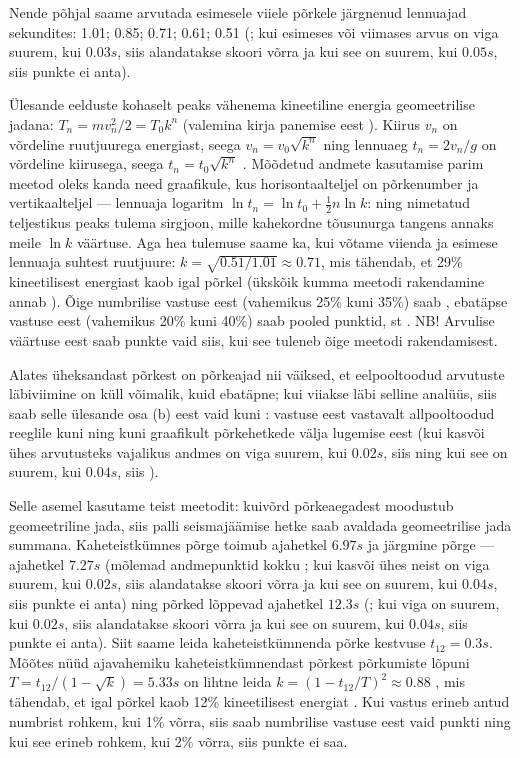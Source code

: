 Nende põhjal saame arvutada esimesele viiele põrkele järgnenud lennuajad sekundites: \num{1,01}; \num{0,85}; \num{0,71}; \num{0,61}; \num{0,51} (; kui esimeses või viimases arvus on viga suurem, kui $\SI {0.03}s$, siis alandatakse skoori  võrra ja kui see on suurem, kui $\SI{0.05}s$, siis punkte ei anta).

Ülesande eelduste kohaselt peaks vähenema kineetiline energia geomeetrilise jadana: $T_n=mv_n^2/2=T_0k^n$ (valemina kirja panemise eest ). Kiirus $v_n$ on võrdeline ruutjuurega energiast, seega $v_n=v_0\sqrt{k^n}$  ning lennuaeg $t_n=2v_n/g$ on võrdeline kiirusega, seega $t_n=t_0\sqrt{k^n}$ . Mõõdetud andmete kasutamise parim meetod oleks kanda need graafikule, kus horisontaalteljel on põrkenumber ja vertikaalteljel --- lennuaja logaritm $\ln t_n=\ln t_0 + \frac 12n\ln k$:  ning nimetatud teljestikus peaks tulema sirgjoon, mille kahekordne tõusunurga tangens annaks meile $\ln k$ väärtuse. Aga hea tulemuse saame ka, kui võtame viienda ja esimese lennuaja suhtest ruutjuure:  $k=\sqrt{0.51/1.01}\approx 0.71$, mis tähendab, et 29\% kineetilisest energiast kaob igal põrkel (ükskõik kumma meetodi rakendamine annab ). Õige numbrilise vastuse eest (vahemikus 25\% kuni 35\%) saab , ebatäpse vastuse eest (vahemikus 20\% kuni 40\%) saab pooled punktid, st . NB! Arvulise väärtuse eest saab punkte vaid siis, kui see tuleneb õige meetodi rakendamisest.

\osa Alates üheksandast põrkest on põrkeajad nii väiksed, et eelpooltoodud arvutuste läbiviimine on küll võimalik, kuid ebatäpne; kui viiakse läbi selline analüüs, siis saab selle ülesande osa (b) eest vaid kuni : vastuse eest vastavalt allpooltoodud reeglile kuni  ning kuni  graafikult põrkehetkede välja lugemise eest (kui kasvõi ühes arvutusteks vajalikus andmes on viga suurem, kui $\SI{0.02}s$, siis  ning kui see on suurem, kui $\SI{0.04}s$, siis ).

Selle asemel kasutame teist meetodit: kuivõrd põrkeaegadest moodustub geomeetriline jada, siis palli seismajäämise hetke saab avaldada geomeetrilise jada summana. Kaheteistkümnes põrge toimub ajahetkel $\SI{6.97}s$ ja järgmine põrge --- ajahetkel $\SI{7.27}s$ (mõlemad andmepunktid kokku ; kui kasvõi ühes neist on viga suurem, kui $\SI {0.02}s$, siis alandatakse skoori  võrra ja kui see on suurem, kui $\SI {0.04}s$, siis punkte ei anta) ning põrked lõppevad ajahetkel $\SI{12.3}s$ (; kui viga on suurem, kui $\SI {0.02}s$, siis alandatakse skoori  võrra ja kui see on suurem, kui $\SI {0.04}s$, siis punkte ei anta). Siit saame leida kaheteistkümnenda põrke kestvuse $t_{12}=\SI{0.3}s$.
Mõõtes nüüd ajavahemiku kaheteistkümnendast põrkest põrkumiste lõpuni $T=t_{12}/(1-\sqrt k)=\SI{5.33}s$  on lihtne leida $k=(1-t_{12}/T)^2\approx 0.88$ , mis tähendab, et igal põrkel kaob 12\% kineetilisest energiat . Kui vastus erineb antud numbrist rohkem, kui 1\% võrra, siis saab numbrilise vastuse eest vaid  punkti ning kui see erineb rohkem, kui 2\% võrra, siis punkte ei saa.

